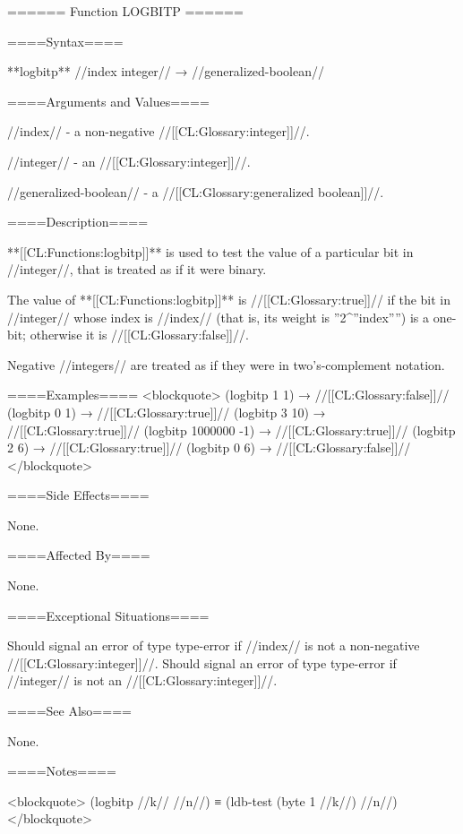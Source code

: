 ====== Function LOGBITP ======

====Syntax====

**logbitp** //index integer// → //generalized-boolean//

====Arguments and Values====

//index// - a non-negative //[[CL:Glossary:integer]]//.

//integer// - an //[[CL:Glossary:integer]]//.

//generalized-boolean// - a //[[CL:Glossary:generalized boolean]]//.

====Description====

**[[CL:Functions:logbitp]]** is used to test the value of a particular bit in //integer//, that is treated as if it were binary.

The value of **[[CL:Functions:logbitp]]** is //[[CL:Glossary:true]]// if the bit in //integer// whose index is //index// (that is, its weight is ''2^''index'''') is a one-bit; otherwise it is //[[CL:Glossary:false]]//.

Negative //integers// are treated as if they were in two's-complement notation.

====Examples==== <blockquote> (logbitp 1 1) → //[[CL:Glossary:false]]// (logbitp 0 1) → //[[CL:Glossary:true]]// (logbitp 3 10) → //[[CL:Glossary:true]]// (logbitp 1000000 -1) → //[[CL:Glossary:true]]// (logbitp 2 6) → //[[CL:Glossary:true]]// (logbitp 0 6) → //[[CL:Glossary:false]]// </blockquote>

====Side Effects====

None.

====Affected By====

None.

====Exceptional Situations====

Should signal an error of type type-error if //index// is not a non-negative //[[CL:Glossary:integer]]//. Should signal an error of type type-error if //integer// is not an //[[CL:Glossary:integer]]//.

====See Also====

None.

====Notes====

<blockquote> (logbitp //k// //n//) ≡ (ldb-test (byte 1 //k//) //n//) </blockquote>

